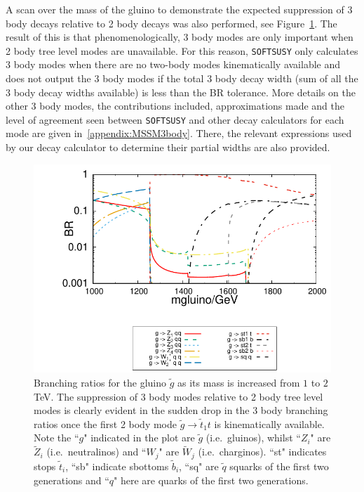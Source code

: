 \documentclass[final,3p,times,pdflatex]{elsarticle}
\begin{document}
A scan over the mass of the gluino to demonstrate the expected suppression of
3 body decays relative to 2 body decays was also performed, see
Figure~\ref{gluino3body}. The result of this is that phenomenologically, 3
body modes are only important when 2 body tree level modes are
unavailable. For this 
reason, {\tt SOFTSUSY} only calculates 3 body modes when there are no
two-body modes kinematically available and does not output the 3 body
modes if 
the total 3 body decay width (sum of all the 3 body decay widths
available) is less than the BR tolerance. 
More details on the other 3 body modes, the contributions included,
approximations made and the level of agreement seen between {\tt SOFTSUSY} and
other decay calculators for each mode are given in~\ref{appendix:MSSM3body}. There, the relevant expressions used by our decay
calculator to determine their partial widths are also provided. 
\begin{figure} %
\centerline{\includegraphics[width = 15.5cm]{figure4}} 
\caption{Branching ratios for the gluino $\tilde{g}$ as its mass is increased
  from $1$ to $2$ TeV. The suppression of 3 body modes relative to 2 body tree
  level modes is clearly evident in the sudden drop in the 3 body branching ratios once the first 2 body mode $\tilde{g} \rightarrow \tilde{t}_1 t$ is kinematically available. Note the ``$g$" indicated in the plot are $\tilde{g}$ (i.e.\ gluinos), whilst ``$Z_i$" are $\tilde{Z}_i$ (i.e.\ neutralinos) and ``$W_j$" are $\tilde{W}_j$ (i.e.\ charginos). ``st" indicates stops $\tilde{t}_i$, ``sb" indicate sbottoms $\tilde{b}_i$, ``sq" are $\tilde{q}$ squarks of the first two generations and ``$q$" here are quarks of the first two generations. } \label{gluino3body}
\end{figure}        
\end{document}
